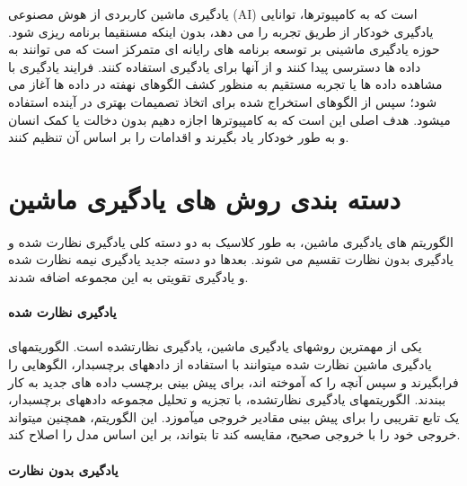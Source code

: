 


یادگیری ماشین کاربردی از هوش مصنوعی (AI) است که به کامپیوترها، توانایی یادگیری خودکار از طریق تجربه  را می دهد، بدون اینکه مسنقیما برنامه ریزی شود. حوزه یادگیری ماشینی بر توسعه برنامه های رایانه ای متمرکز است که می توانند به داده ها دسترسی پیدا کنند و از آنها برای یادگیری استفاده کنند. فرایند یادگیری با مشاهده داده ها یا تجربه مستقیم  به منظور کشف الگوهای نهفته در داده ها آغاز می شود؛  سپس از الگوهای  استخراج شده برای اتخاذ تصمیمات بهتری در آینده استفاده می\nf شود. هدف اصلی این است که به کامپیوترها اجازه دهیم بدون دخالت یا کمک انسان و به طور خودکار یاد بگیرند و اقدامات را بر اساس آن تنظیم کنند.

\section{دسته بندی روش های یادگیری ماشین}
الگوریتم های یادگیری ماشین، به طور کلاسیک به دو دسته کلی یادگیری نظارت شده و یادگیری بدون نظارت تقسیم می شوند. بعدها دو دسته جدید یادگیری نیمه نظارت شده و یادگیری تقویتی به این مجموعه اضافه شدند.
\paragraph{یادگیری نظارت شده}

یکی از مهم\nf ترین روش\nf های یادگیری ماشین، یادگیری نظارت\nf شده است. الگوریتم\nf های یادگیری ماشین نظارت \nf شده می\nf توانند  با استفاده از داده\nf های برچسب\nf دار، الگوهایی  را فرابگیرند و سپس آنچه را که آموخته اند، برای پیش بینی برچسب داده های جدید به کار ببندند. الگوریتم\nf های یادگیری نظارت\nf شده، با تجزیه و تحلیل مجموعه داده\nf های برچسب\nf دار، یک تابع تقریبی را برای پیش بینی مقادیر خروجی می\nf آموزد. این الگوریتم، همچنین می\nf تواند خروجی خود را با خروجی صحیح، مقایسه کند تا بتواند، بر این اساس مدل را اصلاح کند.

\paragraph{یادگیری بدون نظارت}


